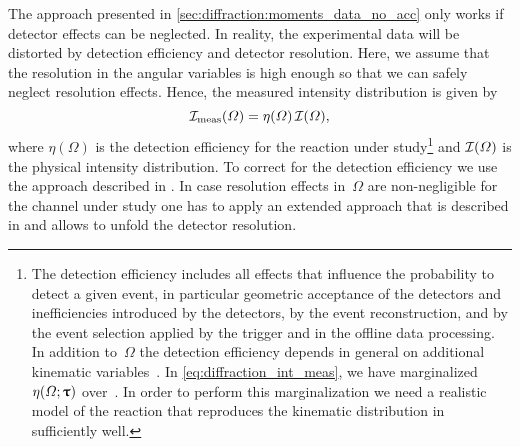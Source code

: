 The approach presented in \cref{sec:diffraction:moments_data_no_acc}
only works if detector effects can be neglected.  In reality, the
experimental data will be distorted by detection efficiency and
detector resolution.  Here, we assume that the resolution in the
angular variables is high enough so that we can safely neglect
resolution effects.  Hence, the measured intensity distribution is
given by
\begin{equation}
  \label{eq:diffraction_int_meas}
  \mathcal{I}_\text{meas}(\Omega)
  = \eta(\Omega)\, \mathcal{I}(\Omega),
\end{equation}
where $\eta(\Omega)$ is the detection efficiency for the reaction
under study\footnote{The detection efficiency includes all effects
that influence the probability to detect a given event, in particular
geometric acceptance of the detectors and inefficiencies introduced by
the detectors, by the event reconstruction, and by the event selection
applied by the trigger and in the offline data processing.  In
addition to~$\Omega$ the detection efficiency depends in general on
additional kinematic variables~\vect{\uptau}.  In
\cref{eq:diffraction_int_meas}, we have marginalized~$\eta(\Omega;
\bm{\mathrm{\uptau}})$ over~\vect{\uptau}.  In order to perform this
marginalization we need a realistic model of the reaction that
reproduces the kinematic distribution in~\vect{\uptau} sufficiently
well.} and $\mathcal{I}(\Omega)$ is the physical intensity
distribution.  To correct for the detection efficiency we use the
approach described in
.
In case resolution effects in~$\Omega$ are non-negligible for the
channel under study one has to apply an extended approach that is
described in 
and allows to unfold the detector resolution.


